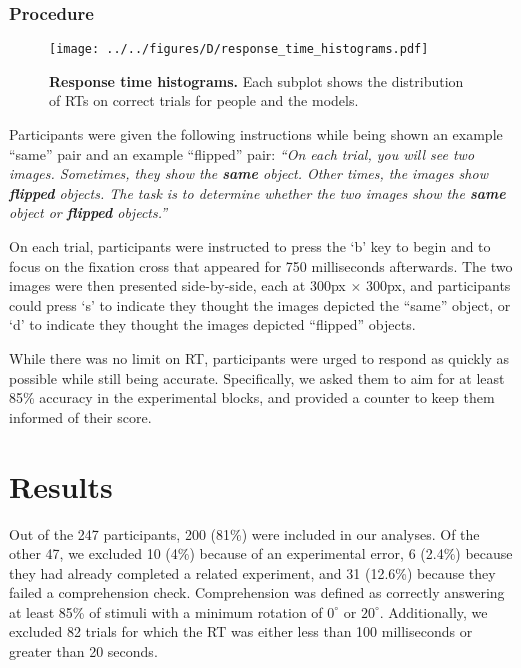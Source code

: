 \documentclass[10pt,letterpaper]{article}
\begin{document}
\subsubsection{Procedure}

\begin{figure*}[t]
  \begin{center}
    \texttt{[image: ../../figures/D/response\_time\_histograms.pdf]}
    \caption{\textbf{Response time histograms.} Each subplot shows the
      distribution of RTs on correct trials for people and the
      models.}
    \label{fig:histograms}
  \end{center}
\end{figure*}

Participants were given the following instructions while being shown
an example ``same'' pair and an example ``flipped'' pair: \textit{``On
  each trial, you will see two images. Sometimes, they show the
  \textbf{same} object. Other times, the images show \textbf{flipped}
  objects. The task is to determine whether the two images show the
  \textbf{same} object or \textbf{flipped} objects.''}

On each trial, participants were instructed to press the `b' key to
begin and to focus on the fixation cross that appeared for 750
milliseconds afterwards. The two images were then presented
side-by-side, each at 300px $\times$ 300px, and participants could
press `s' to indicate they thought the images depicted the ``same''
object, or `d' to indicate they thought the images depicted
``flipped'' objects.

While there was no limit on RT, participants were urged to respond as
quickly as possible while still being accurate. Specifically, we asked
them to aim for at least 85\% accuracy in the experimental blocks, and
provided a counter to keep them informed of their score.

\section{Results}

Out of the 247 participants, 200 (81\%) were included in our
analyses. Of the other 47, we excluded 10 (4\%) because of an
experimental error, 6 (2.4\%) because they had already completed a
related experiment, and 31 (12.6\%) because they failed a
comprehension check. Comprehension was defined as correctly answering
at least 85\% of stimuli with a minimum rotation of $0^\circ$ or
$20^\circ$.  Additionally, we excluded 82 trials for which the RT was
either less than 100 milliseconds or greater than 20 seconds.
\end{document}
